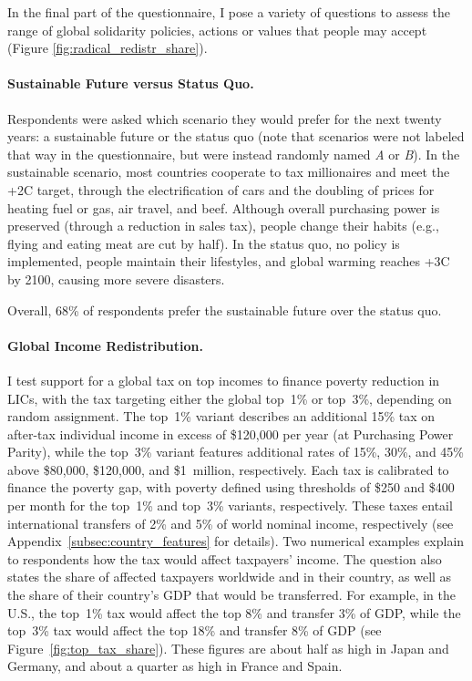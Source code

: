 \documentclass[12pt,english]{article}
\begin{document}
In the final part of the questionnaire, I pose a variety of questions to assess the range of global solidarity policies, actions or values that people may accept (Figure \ref{fig:radical_redistr_share}).

\paragraph{Sustainable Future versus Status Quo.}\label{par:sustainable_future}

Respondents were asked which scenario they would prefer for the next twenty years: a sustainable future or the status quo (note that scenarios were not labeled that way in the questionnaire, but were instead randomly named \textit{A} or \textit{B}). In the sustainable scenario, most countries cooperate to tax millionaires and meet the +2\textdegree{}C target, through the electrification of cars and the doubling of prices for heating fuel or gas, air travel, and beef. Although overall purchasing power is preserved (through a reduction in sales tax), people change their habits (e.g., flying and eating meat are cut by half). In the status quo, no policy is implemented, people maintain their lifestyles, and global warming reaches +3\textdegree{}C by 2100, causing more severe disasters.

Overall, 68\% of respondents prefer the sustainable future over the status quo.

\paragraph{Global Income Redistribution.}\label{par:global_income_redistr}

I test support for a global tax on top incomes to finance poverty reduction in LICs, with the tax targeting either the global top~1\% or top~3\%, depending on random assignment. The top~1\% variant describes an additional 15\% tax on after-tax individual income in excess of \$120,000 per year (at Purchasing Power Parity), while the top~3\% variant features additional rates of 15\%, 30\%, and 45\% above \$80,000, \$120,000, and \$1~million, respectively. Each tax is calibrated to finance the poverty gap, with poverty defined using thresholds of \$250 and \$400 per month for the top~1\% and top~3\% variants, respectively. These taxes entail international transfers of 2\% and 5\% of world nominal income, respectively (see Appendix~\ref{subsec:country_features} for details). 
Two numerical examples explain to respondents how the tax would affect taxpayers' income. The question also states the share of affected taxpayers worldwide and in their country, as well as the share of their country's GDP that would be transferred. For example, in the U.S., the top~1\% tax would affect the top 8\% and transfer 3\% of GDP, while the top~3\% tax would affect the top 18\% and transfer 8\% of GDP (see Figure~\ref{fig:top_tax_share}). These figures are about half as high in Japan and Germany, and about a quarter as high in France and Spain.
\end{document}
